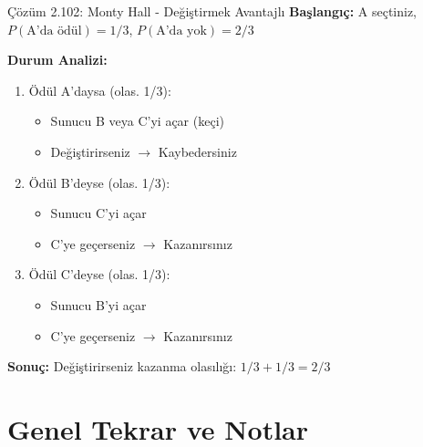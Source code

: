 \documentclass[light]{lutbeamer}
\begin{document}
\begin{frame}{Çözüm 2.102: Monty Hall - Değiştirmek Avantajlı}
    \color{blue}
    \textbf{Başlangıç:} A seçtiniz, $P(\text{A'da ödül}) = 1/3$, $P(\text{A'da yok}) = 2/3$
    
    \vspace{0.3cm}
    \textbf{Durum Analizi:}
    
    \begin{enumerate}
        \item Ödül A'daysa (olas. 1/3):
        \begin{itemize}
            \item Sunucu B veya C'yi açar (keçi)
            \item Değiştirirseniz $\rightarrow$ Kaybedersiniz
        \end{itemize}
        
        \item Ödül B'deyse (olas. 1/3):
        \begin{itemize}
            \item Sunucu C'yi açar
            \item C'ye geçerseniz $\rightarrow$ Kazanırsınız
        \end{itemize}
        
        \item Ödül C'deyse (olas. 1/3):
        \begin{itemize}
            \item Sunucu B'yi açar
            \item C'ye geçerseniz $\rightarrow$ Kazanırsınız
        \end{itemize}
    \end{enumerate}
    
    \vspace{0.3cm}
    \textbf{Sonuç:} Değiştirirseniz kazanma olasılığı: $1/3 + 1/3 = 2/3$
    
    \begin{center}
    \end{center}
\end{frame}

\section{Genel Tekrar ve Notlar}
\end{document}
